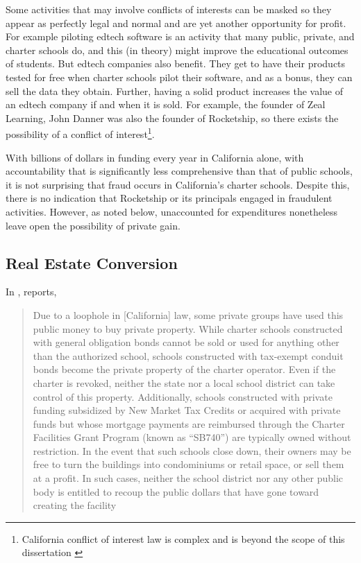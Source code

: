 Some activities that may involve conflicts of interests can be masked so they appear as perfectly legal and normal and are yet another opportunity for profit. For example piloting edtech software is an activity that many public, private, and charter schools do, and this (in theory) might improve the educational outcomes of students. But edtech companies also benefit. They get to have their products tested for free when charter schools pilot their software, and as a bonus, they can sell the data they obtain. Further, having a solid product increases the value of an edtech company if and when it is sold. For example, the founder of Zeal Learning, John Danner was also the founder of Rocketship, so there exists the possibility of a conflict of interest\footnote{California conflict of interest law is complex and is beyond the scope of this dissertation \parencite{Chaney.etal2010}}.

With billions of dollars in funding every year in California alone, with accountability that is significantly less comprehensive than that of public schools, it is not surprising that fraud occurs in California's charter schools. Despite this, there is no indication that Rocketship or its principals engaged in fraudulent activities. However, as noted below, unaccounted for expenditures nonetheless leave open the possibility of private gain. 

\subsection{Real Estate Conversion}%
\label{sec:real-estate-conv}\indent%

In , \citeauthor{ITPI2018} reports,
\blockquote[{\parencite[6]{ITPI2018}}][.]{\SingleSpacing\vspace{-0.5\baselineskip}%
Due to a loophole in [California] law, some private groups have used this public money to buy private property. While charter schools constructed with general obligation bonds cannot be sold or used for anything other than the authorized school, schools constructed with tax-exempt conduit bonds become the private property of the charter operator. Even if the charter is revoked, neither the state nor a local school district can take control of this property. Additionally, schools constructed with private funding subsidized by New Market Tax Credits or acquired with private funds but whose mortgage payments are reimbursed through the Charter Facilities Grant Program (known as “SB740”) are typically owned without restriction. In the event that such schools close down, their owners may be free to turn the buildings into condominiums or retail space, or sell them at a profit. In such cases, neither the school district nor any other public body is entitled to recoup the public dollars that have gone toward creating the facility}

